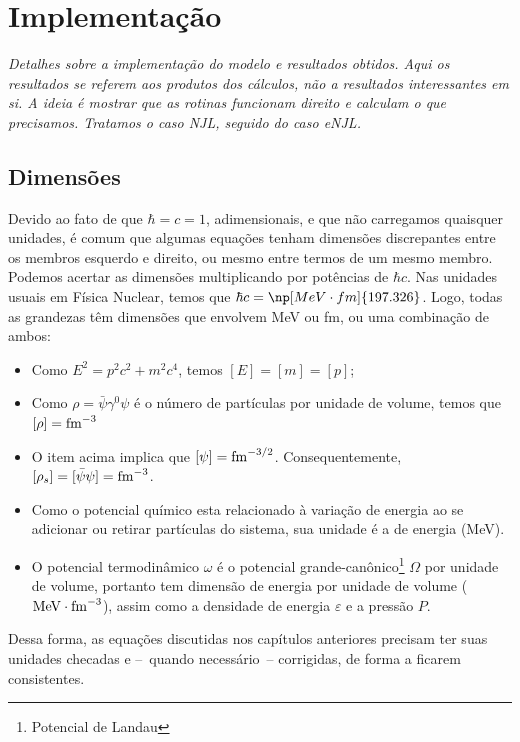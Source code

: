 \chapter{Implementação}

\begin{fullwidth}\it
Detalhes sobre a implementação do modelo e resultados obtidos. Aqui os resultados se referem aos produtos dos cálculos, não a resultados interessantes em si. A ideia é mostrar que as rotinas funcionam direito e calculam o que precisamos. Tratamos o caso NJL, seguido do caso eNJL.
\end{fullwidth}

\section{Dimensões}

Devido ao fato de que $\hbar = c = 1$, adimensionais, e que não carregamos quaisquer unidades, é comum que algumas equações tenham dimensões discrepantes entre os membros esquerdo e direito, ou mesmo entre termos de um mesmo membro. Podemos acertar as dimensões multiplicando por potências de $\hbar c$. Nas unidades usuais em Física Nuclear, temos que $\hbar c = \np[MeV\cdot fm]{197.326}$. Logo, todas as grandezas têm dimensões que envolvem MeV ou fm, ou uma combinação de ambos:

\begin{itemize}
	\item Como $E^2 = p^2c^2 + m^2c^4$, temos $[E] = [m] = [p]$;
	\item Como $\rho = \bar{\psi}\gamma^0\psi$ é o número de partículas por unidade de volume, temos que $[\rho] = \rm{fm}^{-3}$
	\item O item acima implica que $[\psi] = \rm{fm}^{-3/2}$. Consequentemente, $[\rho_s] = [\bar{\psi}\psi] = \rm{fm}^{-3}$. 
	\item Como o potencial químico esta relacionado à variação de energia ao se adicionar ou retirar partículas do sistema, sua unidade é a de energia (MeV).
	\item O potencial termodinâmico $\omega$ é o potencial grande-canônico\footnote{Potencial de Landau} $\Omega$ por unidade de volume, portanto tem dimensão de energia por unidade de volume ($\rm{MeV}\cdot\rm{fm}^{-3}$), assim como a densidade de energia $\varepsilon$ e a pressão $P$.
\end{itemize}
%
Dessa forma, as equações discutidas nos capítulos anteriores precisam ter suas unidades checadas e --~quando necessário~-- corrigidas, de forma a ficarem consistentes.

